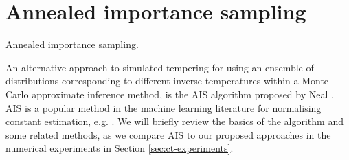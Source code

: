 \section{Annealed importance sampling}\label{sec:annealed-importance-sampling}

\begin{algorithm}[!t]
\caption{Annealed importance sampling.}
\label{alg:annealed-importance-sampling}

\end{algorithm}

An alternative approach to simulated tempering for using an ensemble of distributions corresponding to different inverse temperatures within a Monte Carlo approximate inference method, is the \ac{AIS} algorithm proposed by Neal \citep{neal2001annealed}. \ac{AIS} is a popular method in the machine learning literature for normalising constant estimation, e.g. \citep{salakhutdinov2008quantitative,wu2016quantitative}. We will briefly review the basics of the algorithm and some related methods, as we compare \ac{AIS} to our proposed approaches in the numerical experiments in Section \ref{sec:ct-experiments}.

